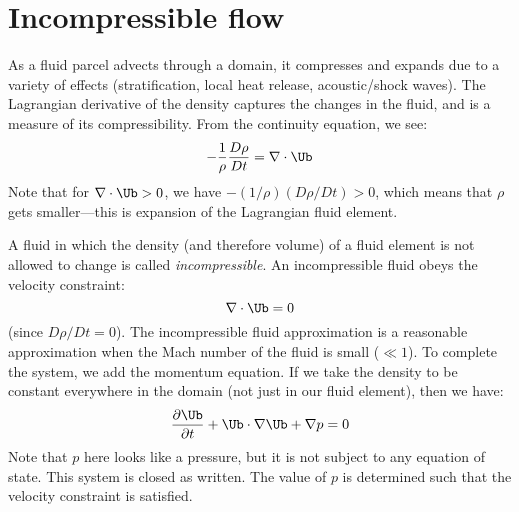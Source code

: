 \label{ch:incompressible}

\section{Incompressible flow}

As a fluid parcel advects through a domain, it compresses and expands
due to a variety of effects (stratification, local heat release,
acoustic/shock waves).  The Lagrangian derivative of the density
captures the changes in the fluid, and is a measure of its compressibility.
From the continuity equation, we see:
\begin{equation}
-\frac{1}{\rho}\frac{D\rho}{Dt} = \nabla \cdot \Ub
\end{equation}
Note that for $\nabla \cdot \Ub > 0$, we have $-(1/\rho) (D\rho/Dt) > 0$,
which means that $\rho$ gets smaller---this is expansion of the Lagrangian
fluid element.

A fluid in which the density (and therefore volume) of a fluid element is not
allowed to change is called {\em incompressible}.  An incompressible
fluid obeys the velocity constraint:
\begin{equation}
\nabla \cdot \Ub = 0
\end{equation}
(since $D\rho / Dt = 0$).  The incompressible fluid approximation is
a reasonable approximation when the Mach number of the fluid is small
($\ll 1$).  To complete the system, we add the momentum equation.  If
we take the density to be constant everywhere in the domain (not just
in our fluid element), then we have:
\begin{equation}
\frac{\partial \Ub}{\partial t} + \Ub \cdot \nabla \Ub + \nabla p = 0
\end{equation}
Note that $p$ here looks like a pressure, but it is not subject to
any equation of state.  This system is closed as written.  The value
of $p$ is determined such that the velocity constraint is satisfied.

